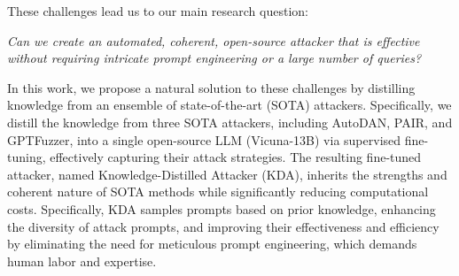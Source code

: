 \newpage

These challenges lead us to our main research question:

\begin{tcolorbox}[width=\linewidth, sharp corners=all, colback=white!95!black]
{\it Can we create an automated, coherent, open-source attacker that is effective without requiring intricate prompt engineering or a large number of queries?}
\end{tcolorbox}


In this work, we propose a natural solution to these challenges by distilling knowledge from an ensemble of state-of-the-art (SOTA) attackers. Specifically, we distill the knowledge from three SOTA attackers, including AutoDAN, PAIR, and GPTFuzzer, into a single open-source LLM (Vicuna-13B) via supervised fine-tuning, effectively capturing their attack strategies. The resulting fine-tuned attacker, named Knowledge-Distilled Attacker (KDA), inherits the strengths and coherent nature of SOTA methods while significantly reducing computational costs. Specifically, KDA samples prompts based on prior knowledge, enhancing the diversity of attack prompts, and improving their effectiveness and efficiency by eliminating the need for meticulous prompt engineering, which demands human labor and expertise. 


